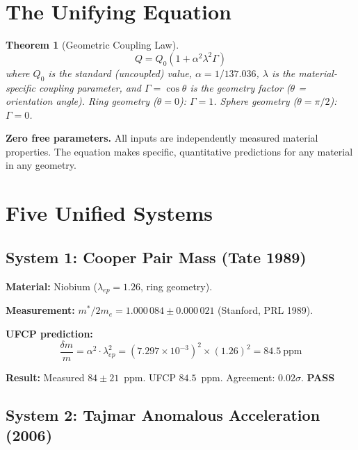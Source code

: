 \documentclass[11pt, a4paper]{article}
\newtheorem{theorem}{Theorem}[section]
\newcommand{\pass}{\textcolor{nm-green}{\textbf{PASS}}}
\begin{document}
\section{The Unifying Equation}

\begin{theorem}[Geometric Coupling Law]
\begin{equation}
  \boxed{Q = Q_0\left(1 + \alpha^2 \lambda^2 \Gamma\right)}
\end{equation}
where $Q_0$ is the standard (uncoupled) value, $\alpha = 1/137.036$,
$\lambda$ is the material-specific coupling parameter, and
$\Gamma = \cos\theta$ is the geometry factor ($\theta$ = orientation
angle). Ring geometry ($\theta = 0$): $\Gamma = 1$. Sphere geometry
($\theta = \pi/2$): $\Gamma = 0$.
\end{theorem}

\textbf{Zero free parameters.} All inputs are independently measured
material properties. The equation makes specific, quantitative
predictions for any material in any geometry.

\section{Five Unified Systems}

\subsection{System 1: Cooper Pair Mass (Tate 1989)}

\textbf{Material:} Niobium ($\lambda_{ep} = 1.26$, ring geometry).

\textbf{Measurement:} $m^*/2m_e = 1.000\,084 \pm 0.000\,021$
(Stanford, PRL 1989).

\textbf{UFCP prediction:}
\begin{equation}
  \frac{\delta m}{m} = \alpha^2 \cdot \lambda_{ep}^2
  = (7.297 \times 10^{-3})^2 \times (1.26)^2 = 84.5~\text{ppm}
\end{equation}

\textbf{Result:} Measured $84 \pm 21$~ppm. UFCP $84.5$~ppm.
Agreement: $0.02\sigma$. \pass

\subsection{System 2: Tajmar Anomalous Acceleration (2006)}
\end{document}
